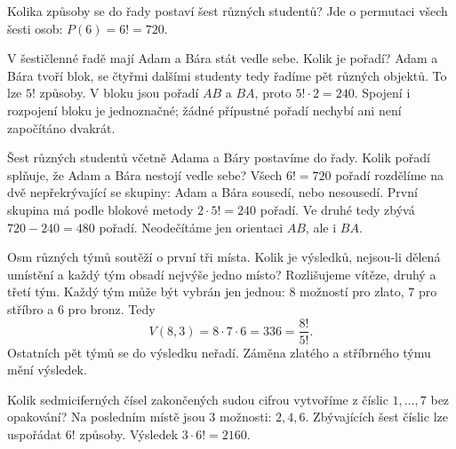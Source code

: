 \documentclass[11pt,a4paper]{article}
\begin{document}

\begin{prikladReseniBox}[title={Příklad P1}]
Kolika způsoby se do řady postaví šest různých studentů?
\tcblower
Jde o permutaci všech šesti osob: \(P(6)=6!=720\).
\end{prikladReseniBox}


\begin{prikladReseniBox}[title={Příklad P2}]
V šestičlenné řadě mají Adam a Bára stát vedle sebe. Kolik je pořadí?
\tcblower
Adam a Bára tvoří blok, se čtyřmi dalšími studenty tedy řadíme pět různých objektů. To lze $5!$ způsoby. V bloku jsou pořadí $AB$ a $BA$, proto $5!\cdot2=240$. Spojení i rozpojení bloku je jednoznačné; žádné přípustné pořadí nechybí ani není započítáno dvakrát.
\end{prikladReseniBox}


\begin{prikladReseniBox}[title={Příklad P3}]
Šest různých studentů včetně Adama a Báry postavíme do řady. Kolik pořadí splňuje, že Adam a Bára nestojí vedle sebe?
\tcblower
Všech $6!=720$ pořadí rozdělíme na dvě nepřekrývající se skupiny: Adam a Bára sousedí, nebo nesousedí. První skupina má podle blokové metody $2\cdot5!=240$ pořadí. Ve druhé tedy zbývá $720-240=480$ pořadí. Neodečítáme jen orientaci $AB$, ale i $BA$.
\end{prikladReseniBox}


\begin{prikladReseniBox}[title={Příklad P4}]
Osm různých týmů soutěží o první tři místa. Kolik je výsledků, nejsou-li dělená umístění a každý tým obsadí nejvýše jedno místo?
\tcblower
Rozlišujeme vítěze, druhý a třetí tým. Každý tým může být vybrán jen jednou: $8$ možností pro zlato, $7$ pro stříbro a $6$ pro bronz. Tedy
\[
 V(8,3)=8\cdot7\cdot6=336=\frac{8!}{5!}.
\]
Ostatních pět týmů se do výsledku neřadí. Záměna zlatého a stříbrného týmu mění výsledek.
\end{prikladReseniBox}


\begin{prikladReseniBox}[title={Příklad P5}]
Kolik sedmiciferných čísel zakončených sudou cifrou vytvoříme z číslic $1,\ldots,7$ bez opakování?
\tcblower
Na posledním místě jsou \(3\) možnosti: \(2,4,6\). Zbývajících šest číslic lze uspořádat \(6!\) způsoby. Výsledek \(3\cdot6!=2160\).
\end{prikladReseniBox}
\end{document}
